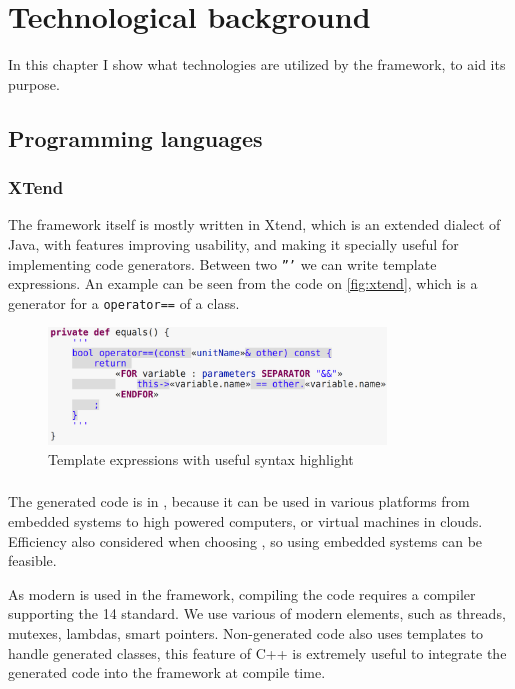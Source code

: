 \chapter{Technological background}

In this chapter I show what technologies are utilized by the framework, to aid its purpose.

\section{Programming languages}


\subsection{XTend}
The framework itself is mostly written in Xtend, which is an extended dialect of Java, with features improving usability, and making it specially useful for implementing code generators. 
Between two \texttt{'''} we can write template expressions.
An example can be seen from the code on \autoref{fig:xtend}, which is a generator for a \cpp{} \texttt{operator==} of a class. 

\begin{figure}[H]
	\begin{center}
		\includegraphics[width=0.8\textwidth]{figures/xtend.png}
		\caption{Template expressions with useful syntax highlight }
		\label{fig:xtend}
	\end{center}
\end{figure}


\subsection{\protect\cpptt }
The generated code is in \cpp{}, because it can be used in various platforms from embedded systems to high powered computers, or virtual machines in clouds. 
Efficiency also considered when choosing \cpp{}, so using embedded systems can be feasible. 

As modern \cpp{} is used in the framework, compiling the code requires a compiler supporting the \cpp{}14 standard.
We use various of modern \cpp{} elements, such as threads, mutexes, lambdas, smart pointers.
Non-generated code also uses templates to handle generated classes, this feature of C++ is extremely useful to integrate the generated code into the framework at compile time.


